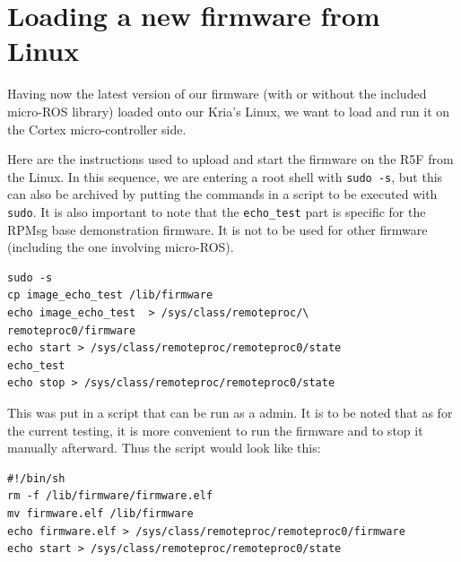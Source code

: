 \documentclass[10pt]{article}
\begin{document}






\section{Loading a new firmware from Linux}
Having now the latest version of our firmware (with or without the included
micro-ROS library) loaded onto our Kria's Linux, we want to load and run it
on the Cortex micro-controller side.

Here are the instructions used to upload and start the firmware
on the R5F from the Linux.
In this sequence, we are entering a root shell with \verb|sudo -s|, but this can
also be archived by putting the commands in a script to be executed with \verb|sudo|.
It is also important to note that the \verb|echo_test| part is specific for the
RPMsg base demonstration firmware. It is not to be used for other firmware
(including the one involving micro-ROS).
\begin{tcolorbox}
\begin{verbatim}
sudo -s
cp image_echo_test /lib/firmware
echo image_echo_test  > /sys/class/remoteproc/\
remoteproc0/firmware
echo start > /sys/class/remoteproc/remoteproc0/state
echo_test
echo stop > /sys/class/remoteproc/remoteproc0/state
\end{verbatim}
\end{tcolorbox}

This was put in a script that can be run as a admin.
It is to be noted that as for the current testing, it is more convenient
to run the firmware and to stop it manually afterward.
Thus the script would look like this:
\begin{tcolorbox}
\begin{verbatim}
#!/bin/sh
rm -f /lib/firmware/firmware.elf
mv firmware.elf /lib/firmware
echo firmware.elf > /sys/class/remoteproc/remoteproc0/firmware
echo start > /sys/class/remoteproc/remoteproc0/state
\end{verbatim}
\end{tcolorbox}
\end{document}
